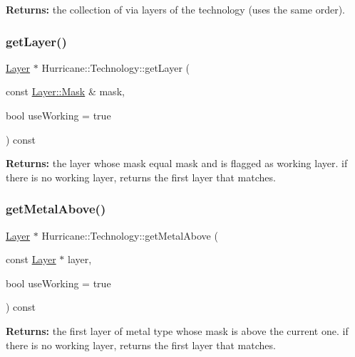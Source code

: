 {\bfseries Returns\+:} the collection of via layers of the technology (uses the same order). \mbox{\label{classHurricane_1_1Technology_a2ab8d2c386bf3daeb2b93d92ecbac6b4}} 
\subsubsection{\texorpdfstring{get\+Layer()}{getLayer()}\hspace{0.1cm}{\footnotesize\ttfamily [2/2]}}
{\footnotesize\ttfamily \hyperlink{classHurricane_1_1Layer}{Layer} $\ast$ Hurricane\+::\+Technology\+::get\+Layer (\begin{DoxyParamCaption}\item[{const \hyperlink{classHurricane_1_1Layer_af5277c670637bd5d910237e7afe01a91}{Layer\+::\+Mask} \&}]{mask,  }\item[{bool}]{use\+Working = {\ttfamily true} }\end{DoxyParamCaption}) const}

{\bfseries Returns\+:} the layer whose mask equal {\ttfamily mask} and is flagged as working layer. if there is no working layer, returns the first layer that matches. \mbox{\label{classHurricane_1_1Technology_af5723b08c9d289ffef8159ac2ea71b74}} 
\subsubsection{\texorpdfstring{get\+Metal\+Above()}{getMetalAbove()}}
{\footnotesize\ttfamily \hyperlink{classHurricane_1_1Layer}{Layer} $\ast$ Hurricane\+::\+Technology\+::get\+Metal\+Above (\begin{DoxyParamCaption}\item[{const \hyperlink{classHurricane_1_1Layer}{Layer} $\ast$}]{layer,  }\item[{bool}]{use\+Working = {\ttfamily true} }\end{DoxyParamCaption}) const}

{\bfseries Returns\+:} the first layer of metal type whose mask is above the current one. if there is no working layer, returns the first layer that matches. \mbox{\label{classHurricane_1_1Technology_ae02123406c7362cc14413727e8689d5a}} 
